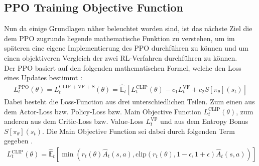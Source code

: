 \subsection{PPO Training Objective Function}
Nun da einige Grundlagen näher beleuchtet worden sind, ist das nächste Ziel die dem PPO zugrunde liegende mathematische Funktion zu verstehen, um im späteren eine eigene Implementierung des PPO durchführen zu können und um einen objektiveren Vergleich der zwei RL-Verfahren durchführen zu können.
\\Der PPO basiert auf den folgenden mathematischen Formel, welche den Loss eines Updates bestimmt \cite[S. 5]{PPO}:
\begin{align}
	\label{eq:PPO_Training_Loss}
	L^\text{PPO}_{t} (\theta) = L^\text{CLIP + VF + S}_{t} (\theta) = \mathbb{\hat{E}}_{t} [L^{\text{CLIP}}_{t}(\theta) - c_{1}L^{\text{VF}}_{t} + c_{2}S[\pi_{\theta}](s_{t})]
\end{align}
Dabei besteht die Loss-Function aus drei unterschiedlichen Teilen. Zum einen aus dem Actor-Loss bzw. Policy-Loss bzw. Main Objective Function $L^{\text{CLIP}}_{t}(\theta)$, zum anderen aus dem Critic-Loss bzw. Value-Loss $L^{\text{VF}}_{t}$ und aus dem Entropy Bonus $S[\pi_{\theta}](s_{t})$. Die Main Objective Function sei dabei durch folgenden Term gegeben \cite[S. 3]{PPO}.
\begin{align}
	\label{eq:clip_loss_ppo}
	L^\text{CLIP}_{t} (\theta) = \mathbb{\hat{E}}_{t} [ \min(r_{t}(\theta) \hat{A}_{t}(s, a), \text{clip}(r_{t}(\theta), 1 - \epsilon, 1 + \epsilon) \hat{A}_{t}(s, a))]
\end{align}

